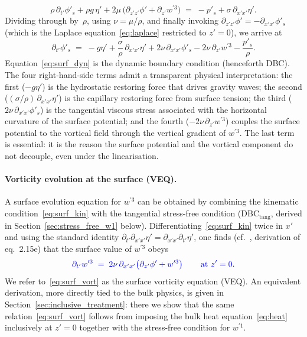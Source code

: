 \documentclass{article}
\begin{document}
\begin{equation}
    \rho\,\partial_{t'}\phi'_s + \rho g\,\eta' + 2\mu\,\big(\partial_{z'z'}\phi' + \partial_{z'} w^{\prime 3}\big) \;=\; -p'_s + \sigma\,\partial_{x'x'}\eta'. \label{eq:dyn_intermediate}
\end{equation}
Dividing through by~$\rho$, using $\nu = \mu/\rho$, and finally invoking $\partial_{z'z'}\phi' = -\partial_{x'x'}\phi'_s$ (which is the Laplace equation~\eqref{eq:laplace} restricted to $z' = 0$), we arrive at
\begin{equation}
    \partial_{t'}\phi'_s \;=\; -g\eta' + \frac{\sigma}{\rho}\,\partial_{x'x'}\eta' + 2\nu\,\partial_{x'x'}\phi'_s - 2\nu\,\partial_{z'} w^{\prime 3} - \frac{p'_s}{\rho}. \label{eq:surf_dyn}
\end{equation}
Equation~\eqref{eq:surf_dyn} is the dynamic boundary condition (henceforth DBC).
The four right-hand-side terms admit a transparent physical interpretation:
the first ($-g\eta'$) is the hydrostatic restoring force that drives gravity waves;
the second ($(\sigma/\rho)\,\partial_{x'x'}\eta'$) is the capillary restoring force from surface tension;
the third ($2\nu\,\partial_{x'x'}\phi'_s$) is the tangential viscous stress associated with the horizontal curvature of the surface potential;
and the fourth ($-2\nu\,\partial_{z'} w^{\prime 3}$) couples the surface potential to the vortical field through the vertical gradient of $w^{\prime 3}$.
The last term is essential: it is the reason the surface potential and the vortical component do not decouple, even under the linearisation.

\paragraph{Vorticity evolution at the surface (VEQ).}
A surface evolution equation for $w^{\prime 3}$ can be obtained by combining the kinematic condition~\eqref{eq:surf_kin} with the tangential stress-free condition (DBC$_{\mathrm{tang}}$, derived in Section~\ref{sec:stress_free_w1} below).
\color{black}
Differentiating~\eqref{eq:surf_kin} twice in $x'$ and using the standard identity $\partial_{t'} \partial_{x'x'}\eta' = \partial_{x'x'}\partial_{t'}\eta'$, one finds (cf.~\citealt{GaleanoRiosEtAl2017}, derivation of eq.~2.15e) that the surface value of $w^{\prime 3}$ obeys
\begin{equation}
\color{blue}
    \partial_{t'} w^{\prime 3} \;=\; 2\nu\, \partial_{x'x'}\!\left(\partial_{z'}\phi' + w^{\prime 3}\right) \qquad \text{at } z' = 0. \label{eq:surf_vort}
\end{equation}
We refer to~\eqref{eq:surf_vort} as the surface vorticity equation (VEQ).
An equivalent derivation, more directly tied to the bulk physics, is given in Section~\ref{sec:inclusive_treatment}: there we show that the same relation~\eqref{eq:surf_vort} follows from imposing the bulk heat equation~\eqref{eq:heat} inclusively at $z' = 0$ together with the stress-free condition for $w^{\prime 1}$.
\end{document}
